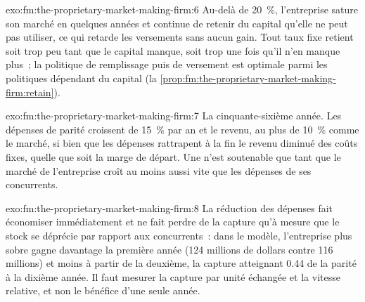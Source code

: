 \begin{solution}{exo:fm:the-proprietary-market-making-firm:6}
Au-delà de 20~\%, l'entreprise sature son marché en quelques années et continue de retenir du capital qu'elle ne peut pas utiliser, ce qui retarde les versements sans aucun gain. Tout taux fixe retient
soit trop peu tant que le capital manque, soit trop une fois qu'il n'en manque plus~; la politique de remplissage puis de versement est optimale parmi les politiques dépendant du capital
(la \cref{prop:fm:the-proprietary-market-making-firm:retain}).
\end{solution}

\begin{solution}{exo:fm:the-proprietary-market-making-firm:7}
La cinquante-sixième année. Les dépenses de parité croissent de 15~\% par an et le revenu, au plus de 10~\% comme le marché, si bien que les dépenses rattrapent à la fin le revenu diminué des coûts fixes,
quelle que soit la marge de départ. Une  n'est soutenable que tant que le marché de l'entreprise croît au moins aussi vite que les dépenses de ses concurrents.
\end{solution}

\begin{solution}{exo:fm:the-proprietary-market-making-firm:8}
La réduction des dépenses fait économiser immédiatement et ne fait perdre de la capture qu'à mesure que le stock se déprécie par rapport aux concurrents~: dans le modèle, l'entreprise plus sobre gagne davantage
la première année (124 millions de dollars contre 116 millions) et moins à partir de la deuxième, la capture atteignant 0.44 de la parité à la dixième année. Il faut mesurer la capture par unité échangée et
la vitesse relative, et non le bénéfice d'une seule année.
\end{solution}

